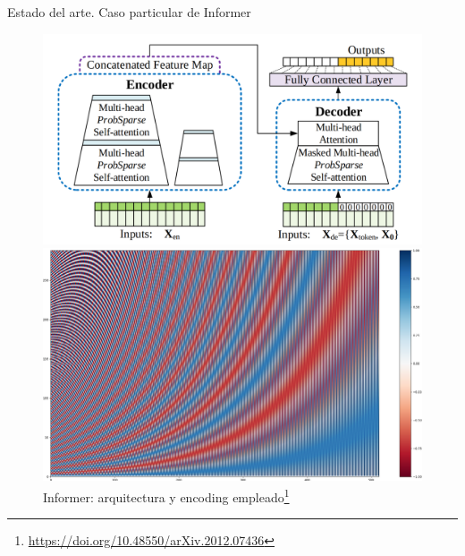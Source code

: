 \documentclass[compress]{beamer}
\begin{document}
	\begin{frame}{Estado del arte. Caso particular de Informer}
		\begin{figure}
			\centering
			\begin{minipage}{0.55\textwidth}
				\centering
				\includegraphics[width=\linewidth]{pic/informer.png}
			\end{minipage}
			\hfill
			\begin{minipage}{0.42\textwidth}
				\centering
				\includegraphics[width=\linewidth]{pic/encd}
			\end{minipage}
			\caption{Informer: arquitectura y encoding empleado\footnote{
					\url{https://doi.org/10.48550/arXiv.2012.07436}}}
		\end{figure}
	
	\end{frame}	 
		
\end{document}
